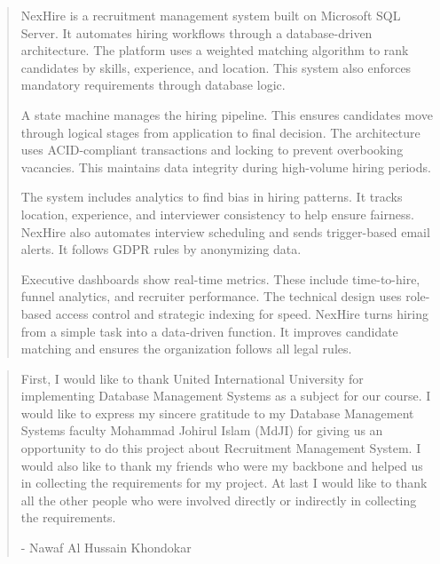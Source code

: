 \documentclass[11pt,a4paper]{article}
\begin{document}
\begin{abstract}
NexHire is a recruitment management system built on Microsoft SQL Server. It automates hiring workflows through a database-driven architecture. The platform uses a weighted matching algorithm to rank candidates by skills, experience, and location. This system also enforces mandatory requirements through database logic.

A state machine manages the hiring pipeline. This ensures candidates move through logical stages from application to final decision. The architecture uses ACID-compliant transactions and locking to prevent overbooking vacancies. This maintains data integrity during high-volume hiring periods.

The system includes analytics to find bias in hiring patterns. It tracks location, experience, and interviewer consistency to help ensure fairness. NexHire also automates interview scheduling and sends trigger-based email alerts. It follows GDPR rules by anonymizing data.

Executive dashboards show real-time metrics. These include time-to-hire, funnel analytics, and recruiter performance. The technical design uses role-based access control and strategic indexing for speed. NexHire turns hiring from a simple task into a data-driven function. It improves candidate matching and ensures the organization follows all legal rules.
\end{abstract}



\newpage


\begin{abstract}
    
First, I would like to thank United International University for implementing Database Management Systems as a subject for our course.
I would like to express my sincere gratitude to my Database Management Systems faculty Mohammad Johirul Islam (MdJI) for giving us an opportunity to do this project about Recruitment Management System.
I would also like to thank my friends who were my backbone and helped us in collecting the requirements for my project.
At last I would like to thank all the other people who were involved directly or indirectly in collecting the requirements.


\begin{flushright}- Nawaf Al Hussain Khondokar\end{flushright}

\end{abstract}
\clearpage %
\end{document}
